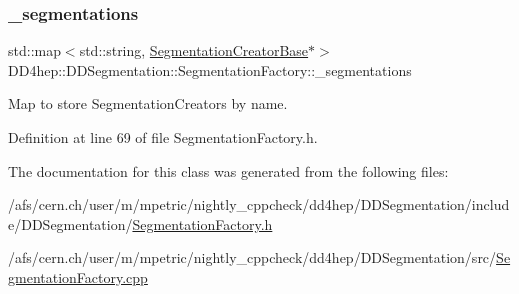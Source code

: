 \hypertarget{class_d_d4hep_1_1_d_d_segmentation_1_1_segmentation_factory_a11fdb394993e5ecbd8dcd67ce89a4552}{}\label{class_d_d4hep_1_1_d_d_segmentation_1_1_segmentation_factory_a11fdb394993e5ecbd8dcd67ce89a4552} 
\subsubsection{\texorpdfstring{\+\_\+segmentations}{\_segmentations}}
{\footnotesize\ttfamily std\+::map$<$std\+::string, \hyperlink{class_d_d4hep_1_1_d_d_segmentation_1_1_segmentation_creator_base}{Segmentation\+Creator\+Base}$\ast$$>$ D\+D4hep\+::\+D\+D\+Segmentation\+::\+Segmentation\+Factory\+::\+\_\+segmentations\hspace{0.3cm}{\ttfamily [protected]}}



Map to store Segmentation\+Creators by name. 



Definition at line 69 of file Segmentation\+Factory.\+h.



The documentation for this class was generated from the following files\+:\begin{DoxyCompactItemize}
\item 
/afs/cern.\+ch/user/m/mpetric/nightly\+\_\+cppcheck/dd4hep/\+D\+D\+Segmentation/include/\+D\+D\+Segmentation/\hyperlink{_segmentation_factory_8h}{Segmentation\+Factory.\+h}\item 
/afs/cern.\+ch/user/m/mpetric/nightly\+\_\+cppcheck/dd4hep/\+D\+D\+Segmentation/src/\hyperlink{_segmentation_factory_8cpp}{Segmentation\+Factory.\+cpp}\end{DoxyCompactItemize}
